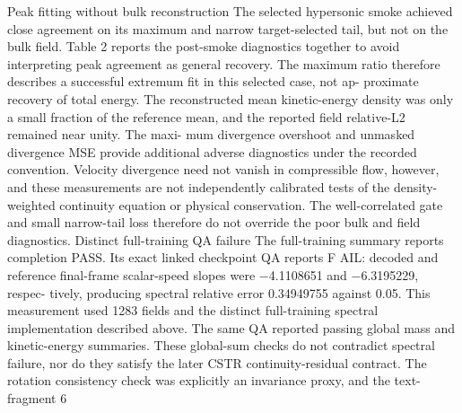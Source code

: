 \documentclass[11pt]{article}
\begin{document}
Peak fitting without bulk reconstruction
The selected hypersonic smoke achieved close agreement on its maximum and narrow target-selected
tail, but not on the bulk field. Table 2 reports the post-smoke diagnostics together to avoid
interpreting peak agreement as general recovery.
The maximum ratio therefore describes a successful extremum fit in this selected case, not ap-
proximate recovery of total energy. The reconstructed mean kinetic-energy density was only a small
fraction of the reference mean, and the reported field relative-L2 remained near unity. The maxi-
mum divergence overshoot and unmasked divergence MSE provide additional adverse diagnostics
under the recorded convention. Velocity divergence need not vanish in compressible flow, however,
and these measurements are not independently calibrated tests of the density-weighted continuity
equation or physical conservation. The well-correlated gate and small narrow-tail loss therefore do
not override the poor bulk and field diagnostics.
Distinct full-training QA failure
The full-training summary reports completion PASS. Its exact linked checkpoint QA reports F AIL:
decoded and reference final-frame scalar-speed slopes were \ensuremath{-}4.1108651 and \ensuremath{-}6.3195229, respec-
tively, producing spectral relative error 0.34949755 against 0.05. This measurement used 1283
fields and the distinct full-training spectral implementation described above.
The same QA reported passing global mass and kinetic-energy summaries. These global-sum
checks do not contradict spectral failure, nor do they satisfy the later CSTR continuity-residual
contract. The rotation consistency check was explicitly an invariance proxy, and the text-fragment
6
\end{document}
